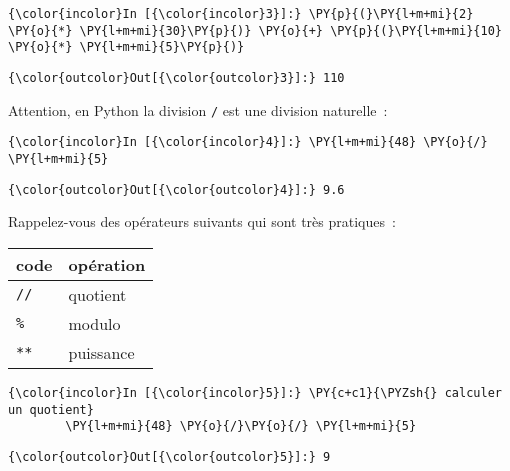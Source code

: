     \begin{Verbatim}[commandchars=\\\{\},frame=single,framerule=0.3mm,rulecolor=\color{cellframecolor}]
{\color{incolor}In [{\color{incolor}3}]:} \PY{p}{(}\PY{l+m+mi}{2} \PY{o}{*} \PY{l+m+mi}{30}\PY{p}{)} \PY{o}{+} \PY{p}{(}\PY{l+m+mi}{10} \PY{o}{*} \PY{l+m+mi}{5}\PY{p}{)}
\end{Verbatim}


\begin{Verbatim}[commandchars=\\\{\},frame=single,framerule=0.3mm,rulecolor=\color{cellframecolor}]
{\color{outcolor}Out[{\color{outcolor}3}]:} 110
\end{Verbatim}
            
    Attention, en Python la division \texttt{/} est une division naturelle~:

    \begin{Verbatim}[commandchars=\\\{\},frame=single,framerule=0.3mm,rulecolor=\color{cellframecolor}]
{\color{incolor}In [{\color{incolor}4}]:} \PY{l+m+mi}{48} \PY{o}{/} \PY{l+m+mi}{5}
\end{Verbatim}


\begin{Verbatim}[commandchars=\\\{\},frame=single,framerule=0.3mm,rulecolor=\color{cellframecolor}]
{\color{outcolor}Out[{\color{outcolor}4}]:} 9.6
\end{Verbatim}
            
    Rappelez-vous des opérateurs suivants qui sont très pratiques~:

\begin{longtable}[]{@{}ll@{}}
\toprule
code & opération\tabularnewline
\midrule
\endhead
\texttt{//} & quotient\tabularnewline
\texttt{\%} & modulo\tabularnewline
\texttt{**} & puissance\tabularnewline
\bottomrule
\end{longtable}

    \begin{Verbatim}[commandchars=\\\{\},frame=single,framerule=0.3mm,rulecolor=\color{cellframecolor}]
{\color{incolor}In [{\color{incolor}5}]:} \PY{c+c1}{\PYZsh{} calculer un quotient}
        \PY{l+m+mi}{48} \PY{o}{/}\PY{o}{/} \PY{l+m+mi}{5}
\end{Verbatim}


\begin{Verbatim}[commandchars=\\\{\},frame=single,framerule=0.3mm,rulecolor=\color{cellframecolor}]
{\color{outcolor}Out[{\color{outcolor}5}]:} 9
\end{Verbatim}
            
